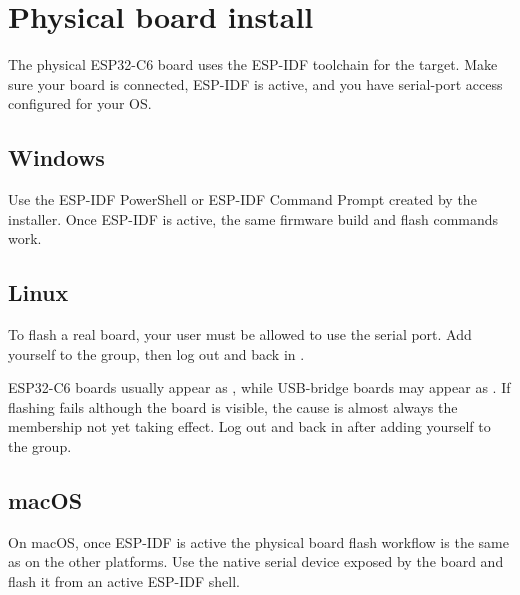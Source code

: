 

\section{Physical board install}

The physical ESP32\nobreakdash-C6 board uses the ESP-IDF toolchain for the
 target. Make sure your board is connected, ESP-IDF is active, and
you have serial-port access configured for your OS.

\subsection{Windows}

Use the ESP-IDF PowerShell or ESP-IDF Command Prompt created by the installer.
Once ESP-IDF is active, the same firmware build and flash commands work.

\subsection{Linux}

To flash a real board, your user must be allowed to use the serial port. Add
yourself to the  group, then log out and back in
\citep{prg32repo}.



\begin{prgaside}
ESP32\nobreakdash-C6 boards usually appear as , while USB-bridge boards may
appear as  \citep{prg32repo}. If flashing fails although the
board is visible, the cause is almost always the  membership not yet
taking effect. Log out and back in after adding yourself to the group.
\end{prgaside}

\subsection{macOS}

On macOS, once ESP-IDF is active the physical board flash workflow is the same as
on the other platforms. Use the native serial device exposed by the board and
flash it from an active ESP-IDF shell.

